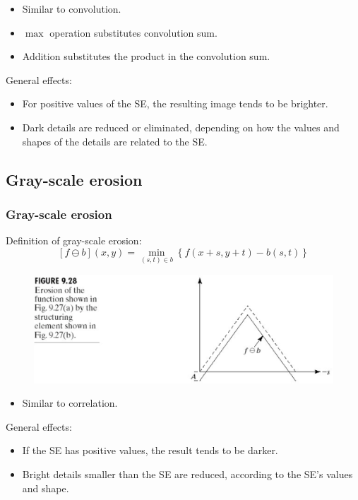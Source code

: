 \begin{frame}
\begin{itemize}
\item Similar to convolution.
\item $\max$ operation substitutes convolution sum.
\item Addition substitutes the product in the convolution sum.
\end{itemize}
General effects:
\begin{itemize}
\item For positive values of the SE, the resulting image tends to be brighter.
\item Dark details are reduced or eliminated, depending on how the values and shapes of the details are related to the SE.
\end{itemize}
\end{frame}

\subsection{Gray-scale erosion}

\begin{frame}
\frametitle{Gray-scale erosion}
Definition of gray-scale erosion:
\[
\left [ f \ominus b \right ] \left ( x, y  \right ) = \min_{(s,t)\in b} \left \{ f(x + s, y + t) - b(s,t) \right \}
\]
\begin{figure}[!h]
\includegraphics[width=\textwidth]{gs-erosion-ex-1.png}
\end{figure}
\end{frame}

\begin{frame}
\begin{itemize}
\item Similar to correlation.
\end{itemize}
General effects:
\begin{itemize}
\item If the SE has positive values, the result tends to be darker.
\item Bright details smaller than the SE are reduced, according to the SE's values and shape.
\end{itemize}
\end{frame}

